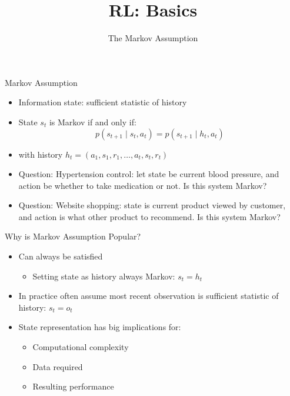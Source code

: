 \documentclass[aspectratio=169]{../latex_main/tntbeamer}  %
\title[Reinforcement Learning: Basics]{RL: Basics}
\subtitle{The Markov Assumption}
\begin{document}
	
	\maketitle

\begin{frame}[c]{Markov Assumption}

\begin{itemize}
	\item Information state: sufficient statistic of history
	\item State $s_t$ is Markov if and only if:
	$$ p(s_{t+1} \mid s_t, a_t) = p(s_{t+1} \mid h_t, a_t)$$
	\item with history $h_t = (a_1, s_1, r_1, \ldots, a_t, s_t, r_t)$
	\pause
	\medskip
	\item \alert{Question:} Hypertension control: let state be current blood pressure, and action be whether to take medication or not. Is this system Markov?
	\item \alert{Question:} Website shopping: state is current product viewed by customer, and action is what other product to recommend. Is this system Markov?
\end{itemize}

\end{frame}
\begin{frame}[c]{Why is Markov Assumption Popular?}
	
	\begin{itemize}
		\item Can always be satisfied
		\begin{itemize}
			\item Setting state as history always Markov: $s_t = h_t$
		\end{itemize}
		\item In practice often assume most recent observation is sufficient statistic
		of history: $s_t = o_t$
		\item State representation has big implications for:
		\begin{itemize}
			\item Computational complexity
			\item Data required
			\item Resulting performance
		\end{itemize}
	\end{itemize}
	
\end{frame}
\end{document}
